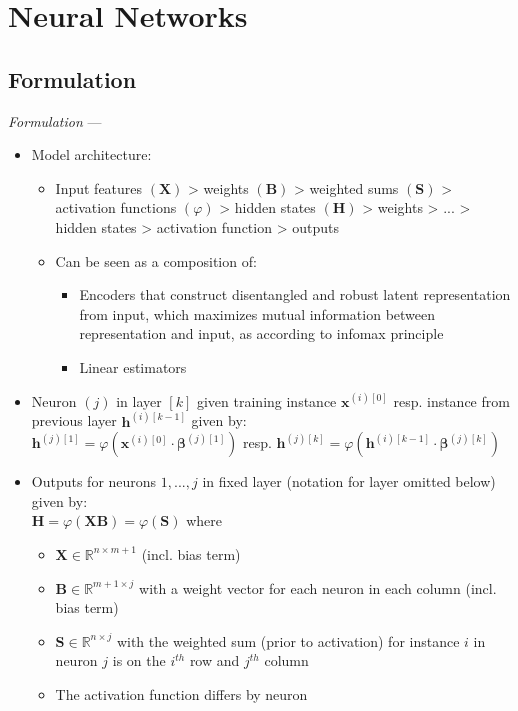 \section{Neural Networks}
\subsection*{Formulation}
\emph{Formulation} --- 
\begin{itemize}
    \item Model architecture: 
    \begin{itemize}
        \item Input features $(\boldsymbol{X})$ > weights $(\boldsymbol{B})$ > weighted sums $(\boldsymbol{S})$ > activation functions $(\varphi)$ > hidden states $(\boldsymbol{H})$ > weights > ... > hidden states > activation function > outputs
        \item Can be seen as a composition of:
        \begin{itemize}
            \item Encoders that construct disentangled and robust latent representation from input, which maximizes mutual information between representation and input, as according to infomax principle
            \item Linear estimators
        \end{itemize}
    \end{itemize}
    \item Neuron $(j)$ in layer $[k]$ given training instance $\boldsymbol{x}^{(i)[0]}$ resp. instance from previous layer $\boldsymbol{h}^{(i)[k-1]}$ given by:\\
    $\boldsymbol{h}^{(j)[1]} = \varphi( \boldsymbol{x}^{(i)[0]} \cdot \boldsymbol{\beta}^{(j)[1]} )$ resp. $\boldsymbol{h}^{(j)[k]} = \varphi( \boldsymbol{h}^{(i)[k-1]} \cdot \boldsymbol{\beta}^{(j)[k]} )$ 
    \item Outputs for neurons $1, ..., j$ in fixed layer (notation for layer omitted below) given by:\\
    $\boldsymbol{H} = \varphi ( \boldsymbol{X} \boldsymbol{B} ) = \varphi ( \boldsymbol{S} )$ where
    \begin{itemize}
        \item $\boldsymbol{X} \in \mathbb{R}^{n \times m+1}$ (incl. bias term)
        \item $\boldsymbol{B} \in \mathbb{R}^{m+1 \times j}$ with a weight vector for each neuron in each column (incl. bias term)
        \item $\boldsymbol{S} \in \mathbb{R}^{n \times j}$ with the weighted sum (prior to activation) for instance $i$ in neuron $j$ is on the $i^{th}$ row and $j^{th}$ column
        \item The activation function differs by neuron
    \end{itemize}
\end{itemize}

